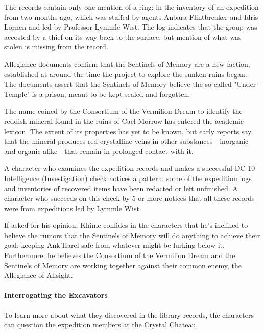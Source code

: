 \documentclass[10pt,a4paper,twoside,twocolumn,openany,nodeprecatedcode]{dndbook}
\begin{document}
\begin{description}[nolistsep]
\item[Expeditions to Cael Morrow.]
The records contain only one mention of a ring: in the inventory of an expedition from two months ago, which was staffed by agents Anbara Flintbreaker and Idris Lornen and led by Professor Lymmle Wist. The log indicates that the group was accosted by a thief on its way back to the surface, but mention of what was stolen is missing from the record.
\item[Sentinels of Memory.]
Allegiance documents confirm that the Sentinels of Memory are a new faction, established at around the time the project to explore the sunken ruins began. The documents assert that the Sentinels of Memory believe the so-called "Under-Temple" is a prison, meant to be kept sealed and forgotten.
\item[Ruidium.]
The name coined by the Consortium of the Vermilion Dream to identify the reddish mineral found in the ruins of Cael Morrow has entered the academic lexicon. The extent of its properties has yet to be known, but early reports say that the mineral produces red crystalline veins in other substances—inorganic and organic alike—that remain in prolonged contact with it.
\end{description}

A character who examines the expedition records and makes a successful DC 10 Intelligence (Investigation) check notices a pattern: some of the expedition logs and inventories of recovered items have been redacted or left unfinished. A character who succeeds on this check by 5 or more notices that all these records were from expeditions led by Lymmle Wist.

If asked for his opinion, Khime confides in the characters that he's inclined to believe the rumors that the Sentinels of Memory will do anything to achieve their goal: keeping Ank'Harel safe from whatever might be lurking below it. Furthermore, he believes the Consortium of the Vermilion Dream and the Sentinels of Memory are working together against their common enemy, the Allegiance of Allsight.

\paragraph{Interrogating the Excavators}
To learn more about what they discovered in the library records, the characters can question the expedition members at the Crystal Chateau.
\end{document}
